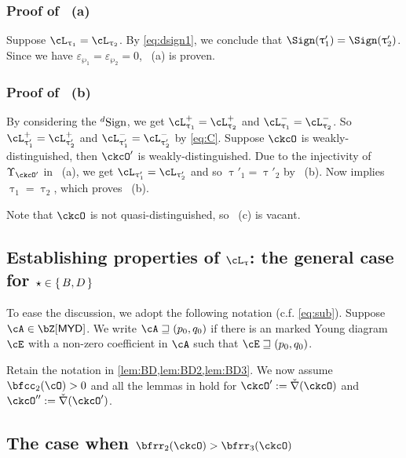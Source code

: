 \documentclass[12pt,a4paper]{amsart}
\def\MYD{{\mathsf{MYD}}}
\def\DD{\nabla}
\numberwithin{equation}{section}
\theoremstyle{remark}
\def\ckDD{{\check\DD}}
\begin{document}
\smallskip

\subsubsection*{Proof of ~(a)}
Suppose $\ac_{\uptau_{1}}=\ac_{\uptau_{2}}$. By \eqref{eq:dsign1},
we conclude that $\Sign(\uptau'_{1})=\Sign(\uptau'_{2})$. Since we have
$\varepsilon_{\wp_{1}}=\varepsilon_{\wp_{2}}=0$, ~(a) is proven.



\subsubsection*{Proof of ~(b)}
By considering the ${}^d\mathrm{Sign}$,  we get $\pac{\uptau_1}=\pac{\uptau_2}$
and $\nac{\uptau_1}=\nac{\uptau_2}$. So $\pac{\uptau'_{1}}=\pac{\uptau'_{2}}$ and
$\nac{\uptau'_{1}}=\nac{\uptau'_{2}}$ by \eqref{eq:C}.
Suppose $\ckcO$ is weakly-distinguished, then $\ckcO'$ is
weakly-distinguished.
Due to the injectivity of $\Upsilon_{\ckcO'}$ in ~(a), we get
$\ac_{\uptau'_{1}}=\ac_{\uptau'_{2}}$ and so $\uptau'_{1}=\uptau'_{2}$ by ~(b).
Now  implies $\uptau_{1}=\uptau_{2}$, which proves ~(b).

\smallskip

Note that $\ckcO$ is not quasi-distinguished, so ~(c) is vacant.


\subsection{Establishing properties of $\ac_{\uptau}$: the general case for $\star\in \set{B,D}$}\label{generalBD}


To ease the discussion, we adopt the following notation (c.f. \eqref{eq:sub}).
Suppose $\cA\in \bZ[\MYD]$. We write $\cA \sqsupseteq (p_{0},q_{0})$ if there is an marked Young diagram $\cE$ with
a non-zero coefficient in $\cA$ such that $\cE\sqsupseteq (p_{0},q_{0})$.


\smallskip
Retain the notation in \cref{lem:BD,lem:BD2,lem:BD3}.
We now assume $\bfcc_{2}(\cO)>0$ and all the lemmas in 
hold for $\ckcO':=\ckDD(\ckcO)$ and $\ckcO'' := \ckDD(\ckcO')$.



\subsection*{The case when $\bfrr_{2}(\ckcO)>\bfrr_{3}(\ckcO)$}
\end{document}
